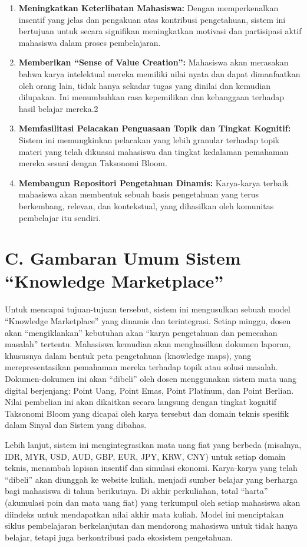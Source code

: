 \documentclass[
  letterpaper,
  DIV=11,
  numbers=noendperiod]{scrreprt}
\begin{document}
\begin{enumerate}
\def\labelenumi{\arabic{enumi}.}
\item
  \textbf{Meningkatkan Keterlibatan Mahasiswa:} Dengan memperkenalkan
  insentif yang jelas dan pengakuan atas kontribusi pengetahuan, sistem
  ini bertujuan untuk secara signifikan meningkatkan motivasi dan
  partisipasi aktif mahasiswa dalam proses pembelajaran.
\item
  \textbf{Memberikan ``Sense of Value Creation'':} Mahasiswa akan
  merasakan bahwa karya intelektual mereka memiliki nilai nyata dan
  dapat dimanfaatkan oleh orang lain, tidak hanya sekadar tugas yang
  dinilai dan kemudian dilupakan. Ini menumbuhkan rasa kepemilikan dan
  kebanggaan terhadap hasil belajar mereka.2
\item
  \textbf{Memfasilitasi Pelacakan Penguasaan Topik dan Tingkat
  Kognitif:} Sistem ini memungkinkan pelacakan yang lebih granular
  terhadap topik materi yang telah dikuasai mahasiswa dan tingkat
  kedalaman pemahaman mereka sesuai dengan Taksonomi Bloom.
\item
  \textbf{Membangun Repositori Pengetahuan Dinamis:} Karya-karya terbaik
  mahasiswa akan membentuk sebuah basis pengetahuan yang terus
  berkembang, relevan, dan kontekstual, yang dihasilkan oleh komunitas
  pembelajar itu sendiri.
\end{enumerate}

\section{C. Gambaran Umum Sistem ``Knowledge
Marketplace''}\label{c.-gambaran-umum-sistem-knowledge-marketplace}

Untuk mencapai tujuan-tujuan tersebut, sistem ini mengusulkan sebuah
model ``Knowledge Marketplace'' yang dinamis dan terintegrasi. Setiap
minggu, dosen akan ``mengiklankan'' kebutuhan akan ``karya pengetahuan
dan pemecahan masalah'' tertentu. Mahasiswa kemudian akan menghasilkan
dokumen laporan, khususnya dalam bentuk peta pengetahuan (knowledge
maps), yang merepresentasikan pemahaman mereka terhadap topik atau
solusi masalah. Dokumen-dokumen ini akan ``dibeli'' oleh dosen
menggunakan sistem mata uang digital berjenjang: Point Uang, Point Emas,
Point Platinum, dan Point Berlian. Nilai pembelian ini akan dikaitkan
secara langsung dengan tingkat kognitif Taksonomi Bloom yang dicapai
oleh karya tersebut dan domain teknis spesifik dalam Sinyal dan Sistem
yang dibahas.

Lebih lanjut, sistem ini mengintegrasikan mata uang fiat yang berbeda
(misalnya, IDR, MYR, USD, AUD, GBP, EUR, JPY, KRW, CNY) untuk setiap
domain teknis, menambah lapisan insentif dan simulasi ekonomi.
Karya-karya yang telah ``dibeli'' akan diunggah ke website kuliah,
menjadi sumber belajar yang berharga bagi mahasiswa di tahun berikutnya.
Di akhir perkuliahan, total ``harta'' (akumulasi poin dan mata uang
fiat) yang terkumpul oleh setiap mahasiswa akan diindeks untuk
mendapatkan nilai akhir mata kuliah. Model ini menciptakan siklus
pembelajaran berkelanjutan dan mendorong mahasiswa untuk tidak hanya
belajar, tetapi juga berkontribusi pada ekosistem pengetahuan.
\end{document}
